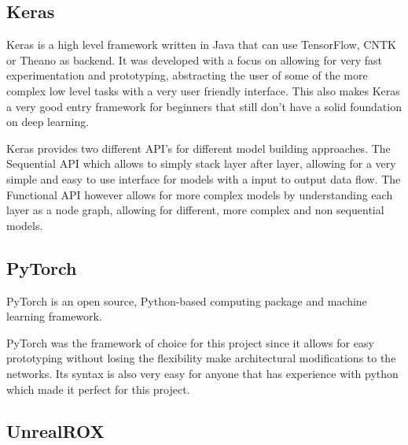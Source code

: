 \subsection{Keras}
Keras is a high level framework written in Java that can use TensorFlow, CNTK or Theano as backend. It was developed with a focus on allowing for very fast experimentation and prototyping, abstracting the user of some of the more complex low level tasks with a very user friendly interface. This also makes Keras a very good entry framework for beginners that still don't have a solid foundation on deep learning.

Keras provides two different API's for different model building approaches. The Sequential API which allows to simply stack layer after layer, allowing for a very simple and easy to use interface for models with a input to output data flow. The Functional API however allows for more complex models by understanding each layer as a node graph, allowing for different, more complex and non sequential models.
 
\subsection{PyTorch}
PyTorch is an open source, Python-based computing package and machine learning framework.

PyTorch was the framework of choice for this project since it allows for easy prototyping without losing the flexibility make architectural modifications to the networks. Its syntax is also very easy for anyone that has experience with python which made it perfect for this project.

\subsection{UnrealROX}
 
